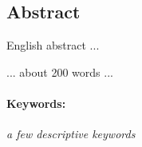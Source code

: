 \subsection*{Abstract}
English abstract ...

... about 200 words ...

\paragraph{Keywords:}
\textit{a few descriptive keywords}

